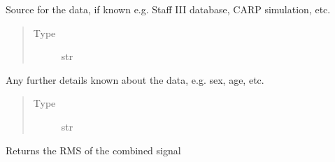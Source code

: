 \documentclass[letterpaper,10pt,english]{sphinxmanual}
\begin{document}
\begin{fulllineitems}
\begin{fulllineitems}
\begin{quote}
\begin{description}
\end{description}\end{quote}

\end{fulllineitems}


\begin{fulllineitems}
\label{\detokenize{_autosummary/signalanalysis.general.Signal:signalanalysis.general.Signal.data_source}}
\sphinxAtStartPar
Source for the data, if known e.g. Staff III database, CARP simulation, etc.
\begin{quote}\begin{description}
\item[{Type}] \leavevmode
\sphinxAtStartPar
str

\end{description}\end{quote}

\end{fulllineitems}


\begin{fulllineitems}
\label{\detokenize{_autosummary/signalanalysis.general.Signal:signalanalysis.general.Signal.comments}}
\sphinxAtStartPar
Any further details known about the data, e.g. sex, age, etc.
\begin{quote}\begin{description}
\item[{Type}] \leavevmode
\sphinxAtStartPar
str

\end{description}\end{quote}

\end{fulllineitems}


\begin{fulllineitems}
\label{\detokenize{_autosummary/signalanalysis.general.Signal:signalanalysis.general.Signal.get_rms}}
\sphinxAtStartPar
Returns the RMS of the combined signal


\end{fulllineitems}
\end{fulllineitems}
\end{document}
